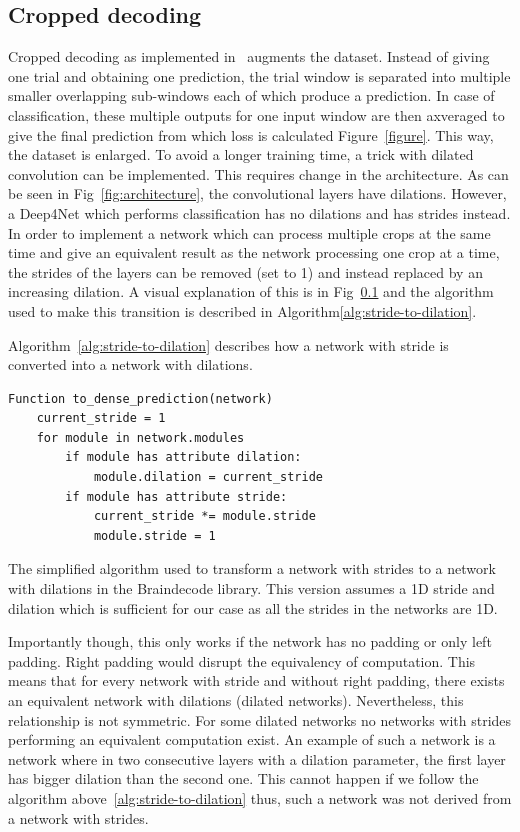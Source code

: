 \subsection{Cropped decoding}
Cropped decoding as implemented in~\cite{schirrmeister-deep-2017} augments the dataset.
Instead of giving one trial and obtaining one prediction, the trial window is separated into multiple smaller overlapping sub-windows each of which produce a prediction.
In case of classification, these multiple outputs for one input window are then axveraged to give the final prediction from which loss is calculated Figure~\ref{figure}.
This way, the dataset is enlarged.
To avoid a longer training time, a trick with dilated convolution can be implemented.
This requires change in the architecture.
As can be seen in Fig~\ref{fig:architecture}, the convolutional layers have dilations.
However, a Deep4Net which performs classification has no dilations and has strides instead.
In order to implement a network which can process multiple crops at the same time and give an equivalent result as the network processing one crop at a time, the strides of the layers can be removed (set to 1) and instead replaced by an increasing dilation.
A visual explanation of this is in Fig~\ref{} and the algorithm used to make this transition is described in Algorithm\ref{alg:stride-to-dilation}.

Algorithm~\ref{alg:stride-to-dilation} describes how a network with stride is converted into a network with dilations.\\
\begin{algorithm}
\begin{verbatim}
Function to_dense_prediction(network)
	current_stride = 1
	for module in network.modules
		if module has attribute dilation:
			module.dilation = current_stride
		if module has attribute stride:
			current_stride *= module.stride
			module.stride = 1
\end{verbatim}
\caption{The simplified algorithm used to transform a network with strides to a network with dilations in the Braindecode library.
This version assumes a 1D stride and dilation which is sufficient for our case as all the strides in the networks are 1D.
}
\label{alg:stride-to-dilation}
\end{algorithm}

Importantly though, this only works if the network has no padding or only left padding.
Right padding would disrupt the equivalency of computation.
This means that for every network with stride and without right padding, there exists an equivalent network with dilations (dilated networks).
Nevertheless, this relationship is not symmetric.
For some dilated networks no networks with strides performing an equivalent computation exist.
An example of such a network is a network where in two consecutive layers with a dilation parameter, the first layer has bigger dilation than the second one.
This cannot happen if we follow the algorithm above~\ref{alg:stride-to-dilation} thus, such a network was not derived from a network with strides.

